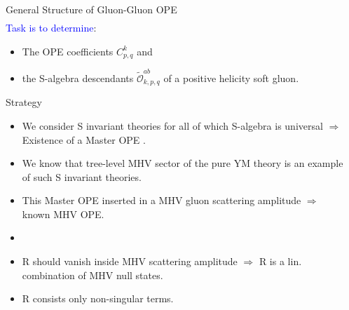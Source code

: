 \documentclass[final]{beamer}
\newlength{\sepwidth}
\newlength{\colwidth}
\newcommand{\separatorcolumn}{\begin{column}{\sepwidth}\end{column}}
\begin{document}
\begin{frame}[t]
\begin{columns}[t]
\begin{column}{\colwidth}
\begin{block}{General Structure of Gluon-Gluon OPE}
\begin{equation}
\begin{split}
				\end{split}
			\end{equation}
			\textcolor{blue}{Task is to determine}: 
			\begin{itemize}
				\item [\ding{45}] The OPE coefficients $C^{k}_{p,q}$ and
				\vspace{2mm}
				\item[\ding{45}] the S-algebra descendants $\tilde{\mathcal{O}}^{ab}_{k,p,q}$ of a positive helicity soft gluon.
			\end{itemize}
		\end{block}
		\begin{block}{Strategy}
			\begin{itemize}
				\item[\ding{45}] We consider S invariant theories for all of which S-algebra is universal $\Rightarrow$ Existence of a Master OPE .
				\vspace{3mm}
				\item[\ding{45}] We know that tree-level MHV sector of the pure YM theory is an example of such S invariant theories.
				\vspace{3mm}
				\item [\ding{45}] This Master OPE inserted in a MHV gluon scattering amplitude $\Rightarrow$ known MHV OPE.
				\vspace{3mm}
				\item [\ding{45}] 
				\vspace{3mm}
				\item [\ding{45}] $\textrm{R}$ should vanish inside MHV scattering amplitude $\Rightarrow$ $\textrm{R}$ is a lin. combination of MHV null states.
				\vspace{3mm} 
				\item [\ding{45}] $\textrm{R}$ consists only non-singular terms.
			\end{itemize}
		\end{block}
	\end{column}
		\separatorcolumn
		

\end{columns}
\end{frame}
\end{document}
